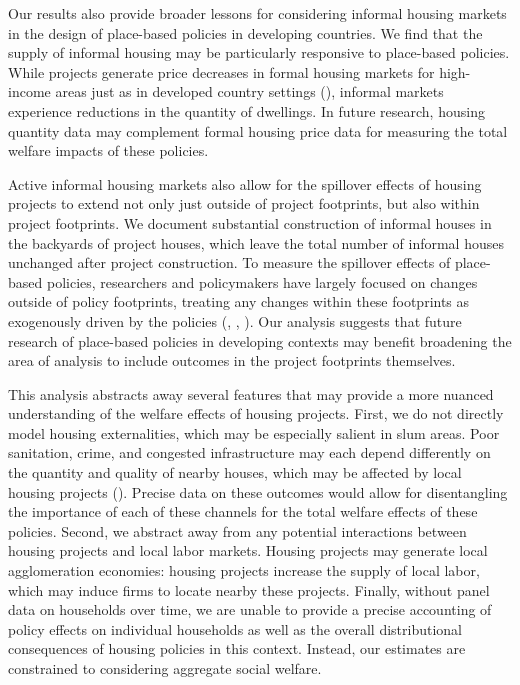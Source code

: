 \documentclass[12pt]{article}
\begin{document}
Our results also provide broader lessons for considering informal housing markets in the design of place-based policies in developing countries.  We find that the supply of informal housing may be particularly responsive to place-based policies.  While projects generate price decreases in formal housing markets for high-income areas just as in developed country settings (\cite{diamond2016wants}), informal markets experience reductions in the quantity of dwellings.  In future research, housing quantity data may complement formal housing price data for measuring the total welfare impacts of these policies.  

Active informal housing markets also allow for the spillover effects of housing projects to extend not only just outside of project footprints, but also within project footprints.  We document substantial construction of informal houses in the backyards of project houses, which leave the total number of informal houses unchanged after project construction.  To measure the spillover effects of place-based policies, researchers and policymakers have largely focused on changes outside of policy footprints, treating any changes within these footprints as exogenously driven by the policies (\cite{diamond2016wants}, \cite{rossi2010housing}, \cite{hornbeck2017creative}).  Our analysis suggests that future research of place-based policies in developing contexts may benefit broadening the area of analysis to include outcomes in the project footprints themselves.

This analysis abstracts away several features that may provide a more nuanced understanding of the welfare effects of housing projects.  First, we do not directly model housing externalities, which may be especially salient in slum areas.  Poor sanitation, crime, and congested infrastructure may each depend differently on the quantity and quality of nearby houses, which may be affected by local housing projects (\cite{marxthere}).  Precise data on these outcomes would allow for disentangling the importance of each of these channels for the total welfare effects of these policies.  Second, we abstract away from any potential interactions between housing projects and local labor markets.  Housing projects may generate local agglomeration economies:  housing projects increase the supply of local labor, which may induce firms to locate nearby these projects.  Finally, without panel data on households over time, we are unable to provide a precise accounting of policy effects on individual households as well as the overall distributional consequences of housing policies in this context.  Instead, our estimates are constrained to considering aggregate social welfare.
\end{document}
